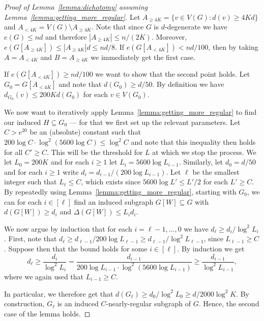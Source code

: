 \documentclass[10pt, a4paper]{article}
\numberwithin{theorem}{section} %
\theoremstyle{remark}
\theoremstyle{definition}
\begin{document}
\begin{proof}[Proof of Lemma~\ref{lemma:dichotomy} assuming Lemma~\ref{lemma:getting_more_regular}]
    Let $A_{\geq 4K} = \{v \in V(G): d(v) \geq 4K d\}$ and $A_{<4K} = V(G) \setminus A_{\geq 4K}$.
    Note that since $G$ is $d$-degenerate we have $e(G) \leq nd$ and therefore $|A_{\geq 4K}| \leq n/(2K)$.
    Moreover, $e(G[A_{\geq 4K}]) \leq |A_{\geq 4K}|d \leq nd/8$.
    If $e(G[A_{<4K}]) < nd/100$, then by taking $A = A_{<4K}$ and $B = A_{\geq 4K}$ we immediately get the first case.

    If $e(G[A_{<4K}]) \geq nd/100$ we want to show that the second point holds.
    Let $G_0 = G[A_{<4K}]$ and note that $d(G_0) \geq d/50$.
    By definition we have $d_{G_0}(v) \leq 200Kd(G_0)$ for each $v \in V(G_0)$.

    We now want to iteratively apply Lemma~\ref{lemma:getting_more_regular} to find our induced $H \subseteq G_0$ --- for that we first set up the relevant parameters. 
    Let $C > e^{20}$ be an (absolute) constant such that $200\log C \cdot \log^2(5600\log C) \leq \log^2 C$ and note that this inequality then holds for all $C' \geq C$.
    This will be the threshold for $L$ at which we stop the process.
    We let $L_0 = 200K$ and for each $i \geq 1$ let $L_i = 5600 \log L_{i-1}$.
    Similarly, let $d_0 = d/50$ and for each $i \geq 1$ write $d_i = d_{i-1} / (200 \log L_{i-1})$.
    Let $\ell$ be the smallest integer such that $L_{\ell} \leq C$, which exists since $5600 \log L' \leq L'/2$ for each $L' \geq C$.
    By repeatedly using Lemma~\ref{lemma:getting_more_regular}, starting with $G_0$, we can for each $i \in [\ell]$ find an induced subgraph $G[W] \subseteq G$ with $d(G[W]) \geq d_i$ and $\Delta(G[W]) \leq L_id_i$.

    We now argue by induction that for each $i =\ell-1, \dots, 0$ we have $d_{\ell} \geq d_i / \log^2L_i$.
    First, note that $d_{\ell} \geq d_{\ell -1} / 200\log L_{\ell - 1} \geq d_{\ell - 1} / \log^2 L_{\ell -1}$, since $L_{\ell - 1} \geq C$.
    Suppose then that the bound holds for some $i \in [\ell]$.
    By induction we get 
    \[
        d_\ell \geq \frac{d_{i}}{\log^2L_i} = \frac{d_{i-1}}{200\log L_{i-1} \cdot \log^2(5600 \log L_{i-1})} \geq \frac{d_{i-1}}{\log^2 L_{i-1}}, 
    \]
    where we again used that $L_{i-1} \geq C$.
    
    In particular, we therefore get that $d(G_{\ell}) \geq d_0 / \log^2 L_0 \geq d/2000\log^2 K$.
    By construction, $G_{\ell}$ is an induced $C$-nearly-regular subgraph of $G$.
    Hence, the second case of the lemma holds.
\end{proof}
\end{document}
